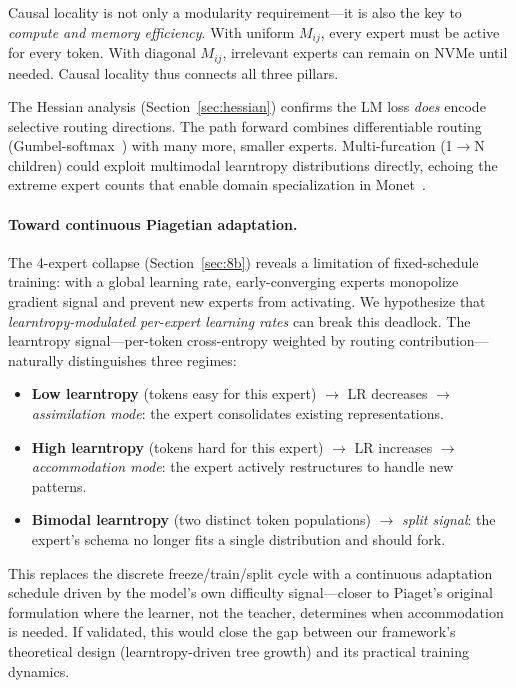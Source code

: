 \documentclass{article}
\begin{document}
Causal locality is not only a modularity requirement---it is also the key to
\emph{compute and memory efficiency}. With uniform $M_{ij}$, every expert must
be active for every token. With diagonal $M_{ij}$, irrelevant experts can
remain on NVMe until needed. Causal locality thus connects all three pillars.

The Hessian analysis (Section~\ref{sec:hessian}) confirms the LM loss
\emph{does} encode selective routing directions. The path forward combines
differentiable routing (Gumbel-softmax~\cite{jang2017gumbel}) with many more,
smaller experts. Multi-furcation (1$\to$N children) could exploit multimodal
learntropy distributions directly, echoing the extreme expert counts that
enable domain specialization in Monet~\cite{monet2025}.

\paragraph{Toward continuous Piagetian adaptation.}
The 4-expert collapse (Section~\ref{sec:8b}) reveals a limitation of
fixed-schedule training: with a global learning rate, early-converging experts
monopolize gradient signal and prevent new experts from activating. We
hypothesize that \emph{learntropy-modulated per-expert learning rates} can
break this deadlock. The learntropy signal---per-token cross-entropy weighted
by routing contribution---naturally distinguishes three regimes:
\begin{itemize}[nosep,leftmargin=1em]
\item \textbf{Low learntropy} (tokens easy for this expert) $\to$ LR
      decreases $\to$ \emph{assimilation mode}: the expert consolidates
      existing representations.
\item \textbf{High learntropy} (tokens hard for this expert) $\to$ LR
      increases $\to$ \emph{accommodation mode}: the expert actively
      restructures to handle new patterns.
\item \textbf{Bimodal learntropy} (two distinct token populations) $\to$
      \emph{split signal}: the expert's schema no longer fits a single
      distribution and should fork.
\end{itemize}
This replaces the discrete freeze/train/split cycle with a continuous
adaptation schedule driven by the model's own difficulty signal---closer to
Piaget's original formulation where the learner, not the teacher, determines
when accommodation is needed. If validated, this would close the gap between
our framework's theoretical design (learntropy-driven tree growth) and its
practical training dynamics.
\end{document}
